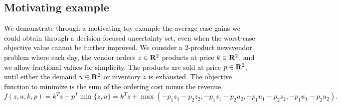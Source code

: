 \documentclass[11pt]{article}
\newcommand{\RC}[1]{\textcolor{black}{#1}}
\begin{document}
\subsection{Motivating example}
\label{sec:intro_sets}
\RC{We demonstrate through a motivating toy example the average-case gains we could obtain through a decision-focused uncertainty set, even when the worst-case objective value cannot be further improved.}
\RC{We consider a 2-product newsvendor problem where each day, the vendor
orders $z\in {\mathbf R}^2$ 
products at price $k \in {\mathbf R}^2$, and we allow fractional values for simplicity. The products are sold at price $p \in {\mathbf R}^2$, until either the demand $u \in {\mathbf R}^2$ or inventory $z$ is exhausted. The objective function to minimize is the sum of the ordering cost minus the revenue, 
$f(z,u,k,p) = k^Tz - p^T\min\{z,u\} = k^Tz + \max(-p_1z_1 - p_2z_2, -p_1z_1 - p_2u_2, -p_1u_1 - p_2z_2, -p_1u_1 - p_2u_2).$}
\end{document}
